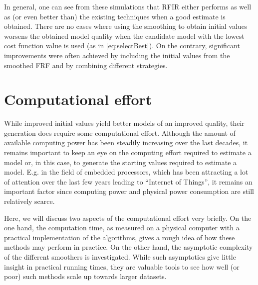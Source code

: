 In general, one can see from these simulations that \gls{RFIR} either performs as well as (or even better than) the existing techniques when a good estimate is obtained.
There are no cases where using the smoothing to obtain initial values worsens the obtained model quality when the candidate model with the lowest cost function value is used (as in \eqref{eq:selectBest}).
On the contrary, significant improvements were often achieved by including the initial values from the smoothed FRF and by combining different strategies.

\section{Computational effort}\label{sec:initvals:computation}
While improved initial values yield better models of an improved quality, their generation does require some computational effort.
Although the amount of available computing power has been steadily increasing over the last decades, it remains important to keep an eye on the computing effort required to estimate a model or, in this case, to generate the starting values required to estimate a model.
E.g. in the field of embedded processors, which has been attracting a lot of attention over the last few years leading to ``Internet of Things'', it remains an important factor since computing power and physical power consumption are still relatively scarce.

Here, we will discuss two aspects of the computational effort very briefly.
On the one hand, the computation time, as measured on a physical computer with a practical implementation of the algorithms, gives a rough idea of how these methods may perform in practice.
On the other hand, the asymptotic complexity of the different smoothers is investigated. 
While such asymptotics give little insight in practical running times, they are valuable tools to see how well (or poor) such methods scale up towards larger datasets.

